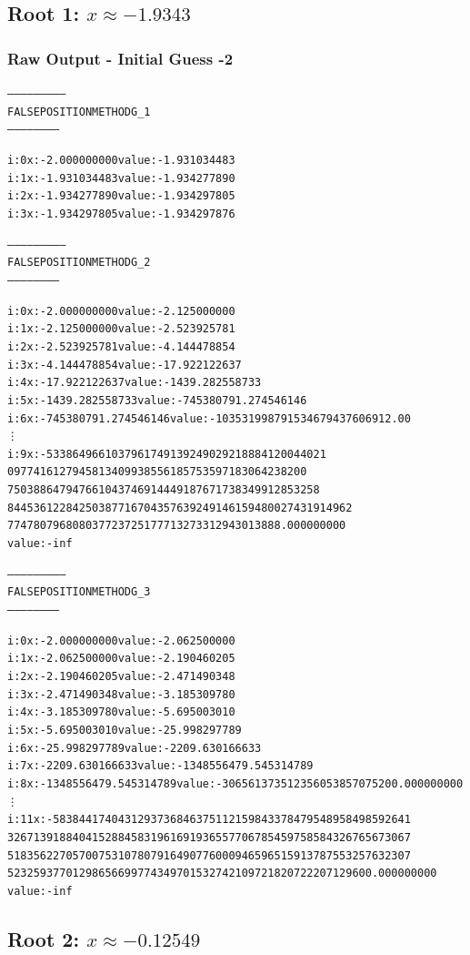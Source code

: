 \documentclass[11pt]{article} %
\begin{document}
\subsection*{Root 1: $x  \approx -1.9343$ }
\subsubsection*{Raw Output - Initial Guess -2}
 
\begin{alltt}

--------------------------
 FALSE POSITION METHOD G_1
 -----------------------


i: 0	x: -2.000000000	value: -1.931034483
i: 1	x: -1.931034483	value: -1.934277890
i: 2	x: -1.934277890	value: -1.934297805
i: 3	x: -1.934297805	value: -1.934297876


--------------------------
 FALSE POSITION METHOD G_2
 -----------------------


i: 0	x: -2.000000000	value: -2.125000000
i: 1	x: -2.125000000	value: -2.523925781
i: 2	x: -2.523925781	value: -4.144478854
i: 3	x: -4.144478854	value: -17.922122637
i: 4	x: -17.922122637	value: -1439.282558733
i: 5	x: -1439.282558733	value: -745380791.274546146
i: 6	x: -745380791.274546146	value: -103531998791534679437606912.00
\vdots
i: 9	x:-5338649661037961749139249029218884120044021
	   0977416127945813409938556185753597183064238200
	   750388647947661043746914449187671738349912853258
	   84453612284250387716704357639249146159480027431914962
	   774780796808037723725177713273312943013888.000000000	
value: -inf

--------------------------
 FALSE POSITION METHOD G_3
 -----------------------


i: 0	x: -2.000000000	value: -2.062500000
i: 1	x: -2.062500000	value: -2.190460205
i: 2	x: -2.190460205	value: -2.471490348
i: 3	x: -2.471490348	value: -3.185309780
i: 4	x: -3.185309780	value: -5.695003010
i: 5	x: -5.695003010	value: -25.998297789
i: 6	x: -25.998297789	value: -2209.630166633
i: 7	x: -2209.630166633	value: -1348556479.545314789
i: 8	x: -1348556479.545314789	value: -306561373512356053857075200.000000000
\vdots
i: 11	x: -5838441740431293736846375112159843378479548958498592641
32671391884041528845831961691936557706785459758584326765673067
51835622705700753107807916490776000946596515913787553257632307
52325937701298656699774349701532742109721820722207129600.000000000	
value: -inf
\end{alltt}
\subsection*{Root 2: $x \approx -0.12549$}
\end{document}
